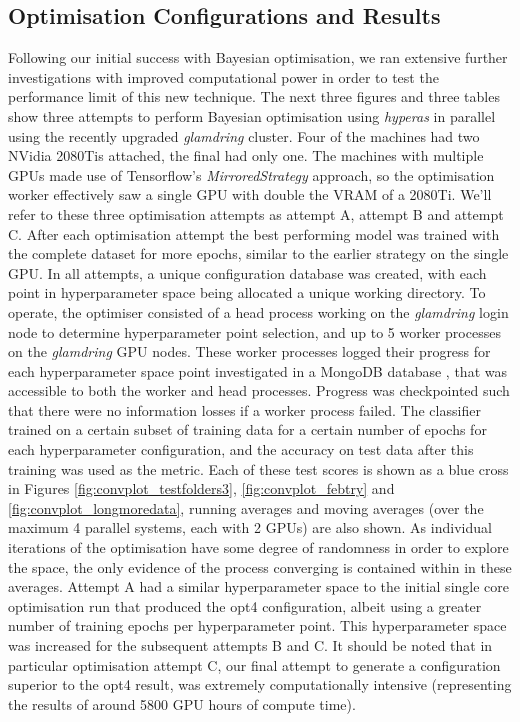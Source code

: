 \subsection{Optimisation Configurations and Results}
Following our initial success with Bayesian optimisation, we ran extensive further investigations with improved computational power in order to test the performance limit of this new technique. The next three figures and three tables show three attempts to perform Bayesian optimisation using \textit{hyperas} in parallel using the recently upgraded \textit{glamdring} cluster. Four of the machines had two NVidia 2080Tis attached, the final had only one. The machines with multiple GPUs made use of Tensorflow's \textit{MirroredStrategy} approach, so the optimisation worker effectively saw a single GPU with double the VRAM of a 2080Ti. We'll refer to these three optimisation attempts as attempt A, attempt B and attempt C. After each optimisation attempt the best performing model was trained with the complete dataset for more epochs, similar to the earlier strategy on the single GPU. In all attempts, a unique configuration database was created, with each point in hyperparameter space being allocated a unique working directory. To operate, the optimiser consisted of a head process working on the \textit{glamdring} login node to determine hyperparameter point selection, and up to 5 worker processes on the \textit{glamdring} GPU nodes. These worker processes logged their progress for each hyperparameter space point investigated in a MongoDB database \cite{mongodb}, that was accessible to both the worker and head processes. Progress was checkpointed such that there were no information losses if a worker process failed. The classifier trained on a certain subset of training data for a certain number of epochs for each hyperparameter configuration, and the accuracy on test data after this training was used as the metric. Each of these test scores is shown as a blue cross in Figures \ref{fig:convplot_testfolders3}, \ref{fig:convplot_febtry} and \ref{fig:convplot_longmoredata}, running averages and moving averages (over the maximum 4 parallel systems, each with 2 GPUs) are also shown. As individual iterations of the optimisation have some degree of randomness in order to explore the space, the only evidence of the process converging is contained within in these averages. Attempt A had a similar hyperparameter space to the initial single core optimisation run that produced the opt4 configuration, albeit using a greater number of training epochs per hyperparameter point. This hyperparameter space was increased for the subsequent attempts B and C. It should be noted that in particular optimisation attempt C, our final attempt to generate a configuration superior to the opt4 result, was extremely computationally intensive (representing the results of around 5800 GPU hours of compute time).

